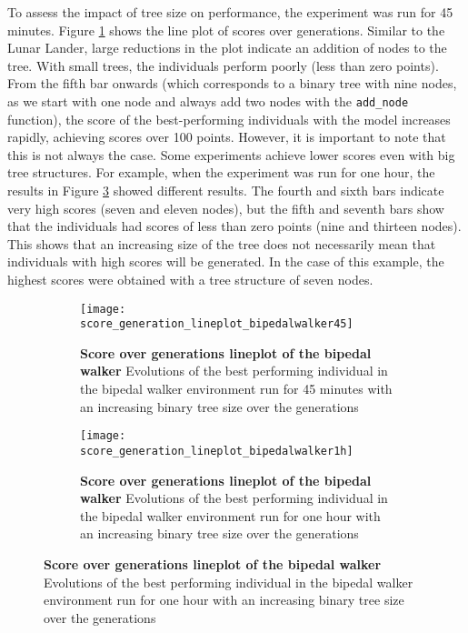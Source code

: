 To assess the impact of tree size on performance, the experiment was run for 45 minutes. Figure \ref{fig:bipedal_lineplot1} shows the line plot of scores over generations. Similar to the Lunar Lander, large reductions in the plot indicate an addition of nodes to the tree. With small trees, the individuals perform poorly (less than zero points). From the fifth bar onwards (which corresponds to a binary tree with nine nodes, as we start with one node and always add two nodes with the \texttt{add\_node} function), the score of the best-performing individuals with the model increases rapidly, achieving scores over 100 points. However, it is important to note that this is not always the case. Some experiments achieve lower scores even with big tree structures. For example, when the experiment was run for one hour, the results in Figure \ref{fig:bipedal_lineplot2} showed different results. The fourth and sixth bars indicate very high scores (seven and eleven nodes), but the fifth and seventh bars show that the individuals had scores of less than zero points (nine and thirteen nodes). This shows that an increasing size of the tree does not necessarily mean that individuals with high scores will be generated. In the case of this example, the highest scores were obtained with a tree structure of seven nodes.
\begin{figure}[!ht]
    \centering
    \begin{subfigure}{0.48\textwidth}
		\texttt{[image: score\_generation\_lineplot\_bipedalwalker45]}
		\caption[Lineplot of the bipedal walker environment run for 45 minutes]{
			\textbf{Score over generations lineplot of the bipedal walker} Evolutions of the best performing individual in the bipedal walker environment run for 45 minutes with an increasing binary tree size over the generations
			}
		\label{fig:bipedal_lineplot1}
    \end{subfigure}%
    \hspace{1em}
    \begin{subfigure}{0.48\textwidth}
        \texttt{[image: score\_generation\_lineplot\_bipedalwalker1h]}
		\caption[Lineplot of the bipedal walker environment run for 1 hour]{
  			\textbf{Score over generations lineplot of the bipedal walker} Evolutions of the best performing individual in the bipedal walker environment run for one hour with an increasing binary tree size over the generations
  			}
		\label{fig:bipedal_lineplot2}
    \end{subfigure}
\end{figure}

